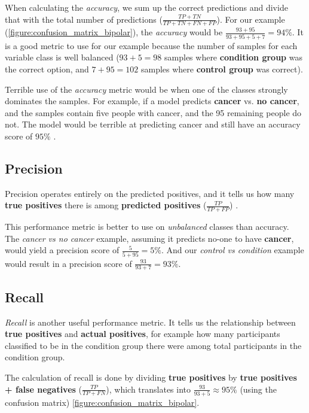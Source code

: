 When calculating the \textit{accuracy}, we sum up the correct predictions and divide that with the total number of predictions ($ \frac{TP + TN}{TP + TN + FN + FP} $). For our example (\ref{figure:confusion_matrix_bipolar}), the \textit{accuracy} would be $ \frac{93 + 95}{93 + 95 + 5 + 7} = 94\% $. It is a good metric to use for our example because the number of samples for each variable class is well balanced ($ 93+5=98 $ samples where \textbf{condition group} was the correct option, and $ 7+95=102 $ samples where \textbf{control group} was correct).

Terrible use of the \textit{accuracy} metric would be when one of the classes strongly dominates the samples. For example, if a model predicts \textbf{cancer} vs. \textbf{no cancer}, and the samples contain five people with cancer, and the 95 remaining people do not. The model would be terrible at predicting cancer and still have an accuracy score of $ 95\% $ \cite{ml_metrics}.

\subsection{Precision} 

Precision operates entirely on the predicted positives, and it tells us how many \textbf{true positives} there is among \textbf{predicted positives} ($ \frac{TP}{TP + FP} $) \cite{ml_metrics}. 

This performance metric is better to use on \textit{unbalanced} classes than accuracy. The \textit{cancer vs no cancer} example, assuming it predicts no-one to have \textbf{cancer}, would yield a precision score of $ \frac{5}{5+95} = 5\% $. And our \textit{control vs condition} example would result in a precision score of $ \frac{93}{93+7} = 93\% $.

\subsection{Recall}

\textit{Recall} is another useful performance metric. It tells us the relationship between \textbf{true positives} and \textbf{actual positives}, for example how many participants classified to be in the condition group there were among total participants in the condition group.

The calculation of recall is done by dividing \textbf{true positives} by \textbf{true positives + false negatives} ($ \frac{TP}{TP+FN} $), which translates into $ \frac{93}{93+5} \approx 95\% $ (using the confusion matrix) \ref{figure:confusion_matrix_bipolar}.


